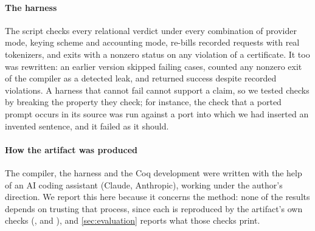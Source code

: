 \paragraph{The harness} The script  checks every relational
verdict under every combination of provider mode, keying scheme and accounting mode,
re-bills recorded requests with real tokenizers, and exits with a nonzero status on
any violation of a certificate. It too was rewritten: an earlier version skipped
failing cases, counted any nonzero exit of the compiler as a detected leak, and
returned success despite recorded violations. A harness that cannot fail cannot
support a claim, so we tested checks by breaking the property they check; for
instance, the check that a ported prompt occurs in its source was run against a port
into which we had inserted an invented sentence, and it failed as it should.

\paragraph{How the artifact was produced} The compiler, the harness and the Coq
development were written with the help of an AI coding assistant (Claude,
Anthropic), working under the author's direction. We report this here because it
concerns the method: none of the results depends on trusting that process, since
each is reproduced by the artifact's own checks (, 
and ), and \cref{sec:evaluation} reports what those
checks print.
